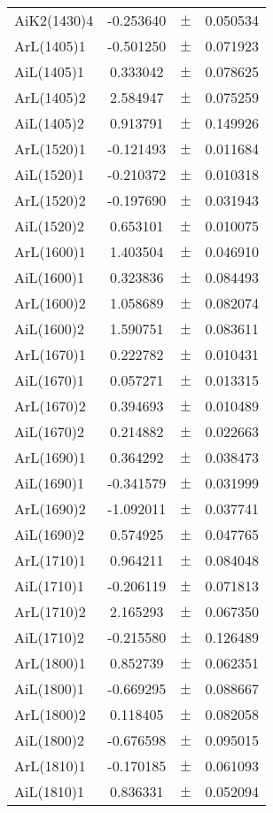 \begin{table}
\begin{tiny}
\begin{tabular}{lccc}
AiK2(1430)4 & -0.253640 & $\pm$ & 0.050534 \\
ArL(1405)1 & -0.501250 & $\pm$ & 0.071923 \\
AiL(1405)1 & 0.333042 & $\pm$ & 0.078625 \\
ArL(1405)2 & 2.584947 & $\pm$ & 0.075259 \\
AiL(1405)2 & 0.913791 & $\pm$ & 0.149926 \\
ArL(1520)1 & -0.121493 & $\pm$ & 0.011684 \\
AiL(1520)1 & -0.210372 & $\pm$ & 0.010318 \\
ArL(1520)2 & -0.197690 & $\pm$ & 0.031943 \\
AiL(1520)2 & 0.653101 & $\pm$ & 0.010075 \\
ArL(1600)1 & 1.403504 & $\pm$ & 0.046910 \\
AiL(1600)1 & 0.323836 & $\pm$ & 0.084493 \\
ArL(1600)2 & 1.058689 & $\pm$ & 0.082074 \\
AiL(1600)2 & 1.590751 & $\pm$ & 0.083611 \\
ArL(1670)1 & 0.222782 & $\pm$ & 0.010431 \\
AiL(1670)1 & 0.057271 & $\pm$ & 0.013315 \\
ArL(1670)2 & 0.394693 & $\pm$ & 0.010489 \\
AiL(1670)2 & 0.214882 & $\pm$ & 0.022663 \\
ArL(1690)1 & 0.364292 & $\pm$ & 0.038473 \\
AiL(1690)1 & -0.341579 & $\pm$ & 0.031999 \\
ArL(1690)2 & -1.092011 & $\pm$ & 0.037741 \\
AiL(1690)2 & 0.574925 & $\pm$ & 0.047765 \\
ArL(1710)1 & 0.964211 & $\pm$ & 0.084048 \\
AiL(1710)1 & -0.206119 & $\pm$ & 0.071813 \\
ArL(1710)2 & 2.165293 & $\pm$ & 0.067350 \\
AiL(1710)2 & -0.215580 & $\pm$ & 0.126489 \\
ArL(1800)1 & 0.852739 & $\pm$ & 0.062351 \\
AiL(1800)1 & -0.669295 & $\pm$ & 0.088667 \\
ArL(1800)2 & 0.118405 & $\pm$ & 0.082058 \\
AiL(1800)2 & -0.676598 & $\pm$ & 0.095015 \\
ArL(1810)1 & -0.170185 & $\pm$ & 0.061093 \\
AiL(1810)1 & 0.836331 & $\pm$ & 0.052094 \\

\end{tabular}
\end{tiny}
\end{table}
